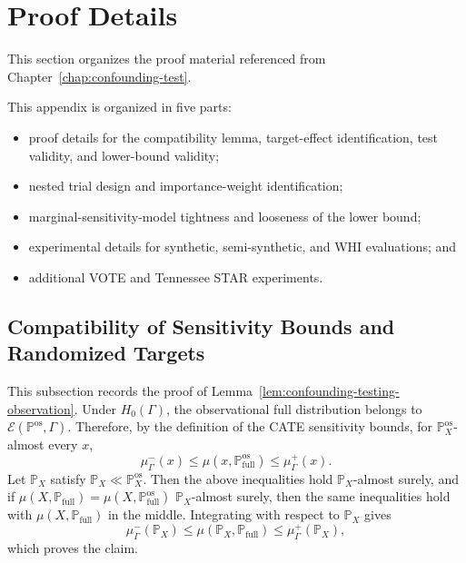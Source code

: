 \section{Proof Details}
\label{app:confounding-proofs}

This section organizes the proof material referenced from Chapter~\ref{chap:confounding-test}.

\begin{tcolorbox}[
  enhanced,
  breakable,
  colback=gray!6,
  colframe=chaptercolor,
  boxrule=0.8pt,
  arc=3pt,
  title={Guide to Appendix~\ref{chap:appendix-confounding-test}},
  colbacktitle=chaptercolor!12,
  coltitle=black
]
This appendix is organized in five parts:
\begin{itemize}
  \item proof details for the compatibility lemma, target-effect identification, test validity, and lower-bound validity;
  \item nested trial design and importance-weight identification;
  \item marginal-sensitivity-model tightness and looseness of the lower bound;
  \item experimental details for synthetic, semi-synthetic, and WHI evaluations; and
  \item additional VOTE and Tennessee STAR experiments.
\end{itemize}
\end{tcolorbox}

\subsection{Compatibility of Sensitivity Bounds and Randomized Targets}
\label{app:confounding-proof-compatibility}

This subsection records the proof of Lemma~\ref{lem:confounding-testing-observation}. Under \(H_0(\Gamma)\), the observational full distribution belongs to \(\mathcal{E}(\mathbb{P}^{\mathrm{os}},\Gamma)\). Therefore, by the definition of the CATE sensitivity bounds, for \(\mathbb{P}^{\mathrm{os}}_X\)-almost every \(x\),
\[
  \mu^-_{\Gamma}(x)
  \leq
  \mu(x,\mathbb{P}^{\mathrm{os}}_{\mathrm{full}})
  \leq
  \mu^+_{\Gamma}(x).
\]
Let \(\mathbb{P}_X\) satisfy \(\mathbb{P}_X \ll \mathbb{P}^{\mathrm{os}}_X\). Then the above inequalities hold \(\mathbb{P}_X\)-almost surely, and if \(\mu(X,\mathbb{P}_{\mathrm{full}})=\mu(X,\mathbb{P}^{\mathrm{os}}_{\mathrm{full}})\) \(\mathbb{P}_X\)-almost surely, then the same inequalities hold with \(\mu(X,\mathbb{P}_{\mathrm{full}})\) in the middle. Integrating with respect to \(\mathbb{P}_X\) gives
\[
  \mu^-_{\Gamma}(\mathbb{P}_X)
  \leq
  \mu(\mathbb{P}_X,\mathbb{P}_{\mathrm{full}})
  \leq
  \mu^+_{\Gamma}(\mathbb{P}_X),
\]
which proves the claim.

